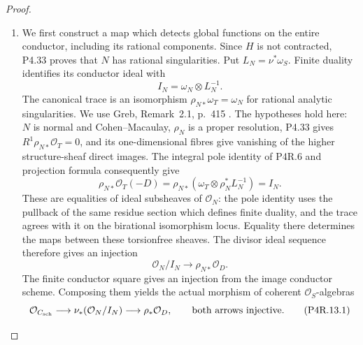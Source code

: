 \begin{proof}
\begin{enumerate}[label={$\langle1\rangle$\arabic*.},leftmargin=*]
\item We first construct a map which detects global functions on
the entire conductor, including its rational components.
Since $H$ is not contracted, P4.33 proves that $N$ has
rational singularities. Put $L_N=\nu^*\omega_S$.
Finite duality identifies its conductor ideal with
\[
 I_N=\omega_N\otimes L_N^{-1}.
\]
The canonical trace is an isomorphism
$\rho_{N*}\omega_T=\omega_N$ for rational analytic
singularities. We use Greb, Remark~2.1, p.~415
\cite{Greb2011}. The hypotheses hold here: $N$ is normal
and Cohen--Macaulay, $\rho_N$ is a proper resolution,
P4.33 gives $R^1\rho_{N*}\mathcal O_T=0$, and its
one-dimensional fibres give vanishing of the higher
structure-sheaf direct images. The integral pole identity
of P4R.6 and projection formula consequently give
\[
 \rho_{N*}\mathcal O_T(-D)
 =\rho_{N*}(\omega_T\otimes\rho_N^*L_N^{-1})
 =I_N.
\]
These are equalities of ideal subsheaves of $\mathcal O_N$:
the pole identity uses the pullback of the same residue
section which defines finite duality, and the trace agrees
with it on the birational isomorphism locus. Equality there
determines the maps between these torsionfree sheaves.
The divisor ideal sequence therefore gives an injection
\[
 \mathcal O_N/I_N\longrightarrow\rho_{N*}\mathcal O_D.
\]
The finite conductor square gives an injection from the
image conductor scheme. Composing them yields the actual
morphism of coherent $\mathcal O_S$-algebras
\[
 \mathcal O_{C_{\rm sch}}\longrightarrow
 \nu_*(\mathcal O_N/I_N)\longrightarrow\rho_*\mathcal O_D,
 \qquad\hbox{both arrows injective}.                         \tag{P4R.13.1}
\]


\end{enumerate}
\end{proof}
